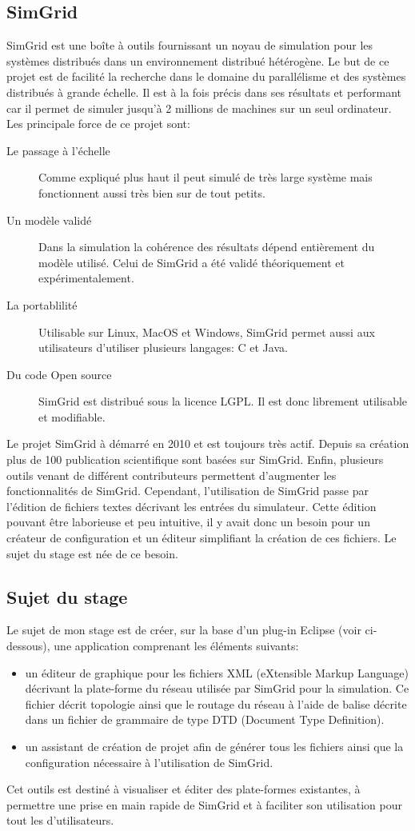 \documentclass{article}
\begin{document}
	\subsection{SimGrid}
	SimGrid est une boîte à outils fournissant un noyau de simulation pour les systèmes distribués dans un environnement distribué hétérogène. Le but de ce projet est de facilité la recherche dans le domaine du parallélisme et des systèmes distribués à grande échelle. Il est à la fois précis dans ses résultats et performant car il permet de simuler jusqu'à 2 millions de machines sur un seul ordinateur.
	Les principale force de ce projet sont:
	\begin{description}
		\item[Le passage à l'échelle] Comme expliqué plus haut il peut simulé de très large système mais fonctionnent aussi très bien sur de tout petits.
		\item[Un modèle validé] Dans la simulation la cohérence des résultats dépend entièrement du modèle utilisé. Celui de SimGrid a été validé théoriquement et expérimentalement.
		\item[La portablilité] Utilisable sur Linux, MacOS et Windows, SimGrid permet aussi aux utilisateurs d'utiliser plusieurs langages: C et Java.
		\item[Du code Open source] SimGrid est distribué sous la licence LGPL. Il est donc librement utilisable et modifiable.
	\end{description}
	Le projet SimGrid à démarré en 2010 et est toujours très actif. Depuis sa création plus de 100 publication scientifique sont basées sur SimGrid. Enfin, plusieurs outils venant de différent contributeurs permettent d'augmenter les fonctionnalités de SimGrid. 
	Cependant, l'utilisation de SimGrid passe par l'édition de fichiers textes décrivant les entrées du simulateur. Cette édition pouvant être laborieuse et peu intuitive, il y avait donc un besoin pour un créateur de configuration et un éditeur simplifiant la création de ces fichiers. Le sujet du stage est née de ce besoin.

	\subsection{Sujet du stage}
		Le sujet de mon stage est de créer, sur la base d'un plug-in Eclipse (voir ci-dessous), une application comprenant les éléments suivants:
		\begin{itemize}
	 		\item un éditeur de graphique pour les fichiers XML (eXtensible Markup Language) décrivant la plate-forme du réseau utilisée par SimGrid pour la simulation. Ce fichier décrit topologie ainsi que le routage du réseau à l'aide de balise décrite dans un fichier de grammaire de type DTD (Document Type Definition).
	 		\item un assistant de création de projet afin de générer tous les fichiers ainsi que la configuration nécessaire à l'utilisation de SimGrid.
		\end{itemize}
	Cet outils est destiné à visualiser et éditer des plate-formes existantes, à permettre une prise en main rapide de SimGrid et à faciliter son utilisation pour tout les d'utilisateurs.
\end{document}
